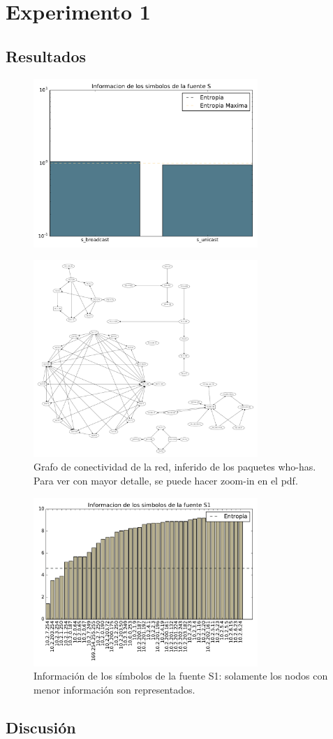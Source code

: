 \section{Experimento 1}

\subsection{Resultados}

\begin{figure}[H]
  \centering
  \includegraphics[width=8.5cm]{exp_labo/grafico1.pdf}
  \caption{\normalfont }
\end{figure}

\begin{figure}[H]
  \centering
  \includegraphics[width=8.5cm]{exp_labo/grafico2.pdf}
  \caption{  \normalfont Grafo de conectividad de la red, inferido de los paquetes who-has. Para ver con mayor detalle, se puede hacer zoom-in en el pdf. }
\end{figure}

\begin{figure}[H]
  \centering
  \includegraphics[width=8.5cm]{exp_labo/grafico3.pdf}
  \caption{ \normalfont Información de los símbolos de la fuente S1: solamente los nodos con menor información son representados.}
\end{figure}

\subsection{Discusión}
